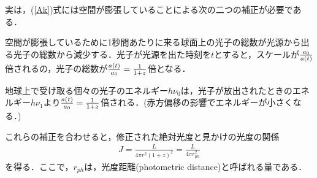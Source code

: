 実は，(\ref{Ak})式には空間が膨張していることによる次の二つの補正が必要である．

空間が膨張しているために1秒間あたりに来る球面上の光子の総数が光源から出る光子の総数から減少する．光子が光源を出た時刻を$t$とすると，スケールが${a_0\over a(t)}$倍されるの，光子の総数が${a(t)\over a_0}=\frac{1}{1+z}$倍となる．

地球上で受け取る個々の光子のエネルギー$h\nu_{0}$は，光子が放出されたときのエネルギー$h\nu_1$より${a(t)\over a_0}=\frac{1}{1+z}$倍される．(赤方偏移の影響でエネルギーが小さくなる．)

これらの補正を合わせると，修正された絶対光度と見かけの光度の関係
\begin{eqnarray}
\label{Ak}
J=\frac{L}{4\pi r^2(1+z)^2}=\frac{L}{4\pi r^2_{ph}}
\end{eqnarray}
を得る．ここで，$r_{ph}$は，光度距離(photometric distance)と呼ばれる量である．
